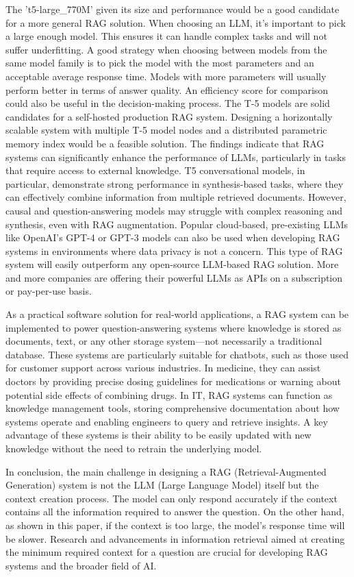 \documentclass{wseas}
\begin{document}
The 't5-large\_770M' given its size and performance would be a good candidate for a more general RAG solution.
When choosing an LLM, it's important to pick a large enough model. This ensures it can handle complex tasks and
will not suffer underfitting. A good strategy when choosing between models from the same model family is to pick the model 
with the most parameters and an acceptable average response time. Models with more parameters will usually
perform better in terms of answer quality. An efficiency score for comparison could also be useful in the decision-making process.
The T-5 models are solid candidates for a self-hosted production RAG system. Designing a horizontally scalable 
system with multiple T-5 model nodes and a distributed parametric memory index would be a feasible solution. 
The findings indicate that RAG systems can significantly enhance the performance of LLMs, particularly in 
tasks that require access to external knowledge. T5 conversational models, in particular, demonstrate strong 
performance in synthesis-based tasks, where they can effectively combine information from multiple retrieved documents.
However, causal and question-answering models may struggle with complex reasoning and synthesis, even with RAG augmentation.  
Popular cloud-based, pre-existing LLMs like OpenAI's GPT-4 or GPT-3 models can also be used when developing 
RAG systems in environments where data privacy is not a concern. This type of RAG system will easily outperform any open-source LLM-based RAG solution. 
More and more companies are offering their powerful LLMs as APIs on a subscription or pay-per-use basis.

As a practical software solution for real-world applications, a RAG system can be implemented to power question-answering systems where knowledge is stored as documents, text, or any other storage system—not necessarily a traditional database. These systems are particularly suitable for chatbots, such as those used for customer support across various industries. In medicine, they can assist doctors by providing precise dosing guidelines for medications or warning about potential side effects of combining drugs. In IT, RAG systems can function as knowledge management tools, storing comprehensive documentation about how systems operate and enabling engineers to query and retrieve insights. A key advantage of these systems is their ability to be easily updated with new knowledge without the need to retrain the underlying model.

In conclusion, the main challenge in designing a RAG (Retrieval-Augmented Generation) system is not the
LLM (Large Language Model) itself but the context creation process. The model can only respond accurately 
if the context contains all the information required to answer the question. On the other hand, as shown 
in this paper, if the context is too large, the model's response time will be slower. Research and advancements 
in information retrieval aimed at creating the minimum required context for a question are crucial for developing 
RAG systems and the broader field of AI.
\end{document}
